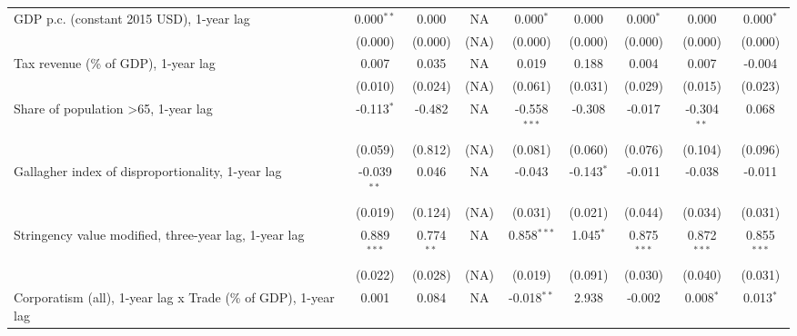 \begin{table}[htbp]
\begin{tabular}{lcccccccc}
      GDP p.c. (constant 2015 USD), 1-year lag                       & 0.000$^{**}$  & 0.000                     & NA           & 0.000$^{*}$    & 0.000            & 0.000$^{*}$     & 0.000           & 0.000$^{*}$\\   
                                                                     & (0.000)       & (0.000)                   & (NA)         & (0.000)        & (0.000)          & (0.000)         & (0.000)         & (0.000)\\   
      Tax revenue (\% of GDP), 1-year lag                            & 0.007         & 0.035                     & NA           & 0.019          & 0.188            & 0.004           & 0.007           & -0.004\\   
                                                                     & (0.010)       & (0.024)                   & (NA)         & (0.061)        & (0.031)          & (0.029)         & (0.015)         & (0.023)\\   
      Share of population >65, 1-year lag                            & -0.113$^{*}$  & -0.482                    & NA           & -0.558$^{***}$ & -0.308           & -0.017          & -0.304$^{**}$   & 0.068\\   
                                                                     & (0.059)       & (0.812)                   & (NA)         & (0.081)        & (0.060)          & (0.076)         & (0.104)         & (0.096)\\   
      Gallagher index of disproportionality, 1-year lag              & -0.039$^{**}$ & 0.046                     & NA           & -0.043         & -0.143$^{*}$     & -0.011          & -0.038          & -0.011\\   
                                                                     & (0.019)       & (0.124)                   & (NA)         & (0.031)        & (0.021)          & (0.044)         & (0.034)         & (0.031)\\   
      Stringency value modified, three-year lag, 1-year lag          & 0.889$^{***}$ & 0.774$^{**}$              & NA           & 0.858$^{***}$  & 1.045$^{*}$      & 0.875$^{***}$   & 0.872$^{***}$   & 0.855$^{***}$\\   
                                                                     & (0.022)       & (0.028)                   & (NA)         & (0.019)        & (0.091)          & (0.030)         & (0.040)         & (0.031)\\   
      Corporatism (all), 1-year lag x Trade (\% of GDP), 1-year lag  & 0.001         & 0.084                     & NA           & -0.018$^{**}$  & 2.938            & -0.002          & 0.008$^{*}$     & 0.013$^{*}$\\   

\end{tabular}
\end{table}
